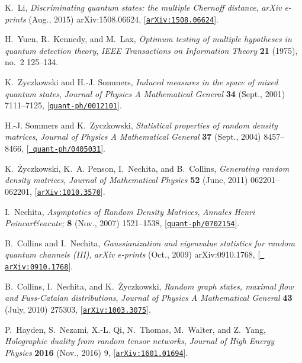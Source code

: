 \documentclass[a4paper,11pt]{article}
\begin{document}
\begin{thebibliography}{100}
K.~{Li}, {\it {Discriminating quantum states: the multiple Chernoff distance}},
   {\em arXiv e-prints} (Aug., 2015) arXiv:1508.06624,
  [\href{http://arxiv.org/abs/1508.06624}{{\tt arXiv:1508.06624}}].

H.~{Yuen}, R.~{Kennedy}, and M.~{Lax}, {\it Optimum testing of multiple
  hypotheses in quantum detection theory},  {\em IEEE Transactions on
  Information Theory} {\bf 21} (1975), no.~2 125--134.

K.~{Zyczkowski} and H.-J. {Sommers}, {\it {Induced measures in the space of
  mixed quantum states}},  {\em Journal of Physics A Mathematical General} {\bf
  34} (Sept., 2001) 7111--7125,
  [\href{http://arxiv.org/abs/quant-ph/0012101}{{\tt quant-ph/0012101}}].

H.-J. {Sommers} and K.~{Zyczkowski}, {\it {Statistical properties of random
  density matrices}},  {\em Journal of Physics A Mathematical General} {\bf 37}
  (Sept., 2004) 8457--8466, [\href{http://arxiv.org/abs/quant-ph/0405031}{{\tt
  quant-ph/0405031}}].

K.~{{\.Z}yczkowski}, K.~A. {Penson}, I.~{Nechita}, and B.~{Collins}, {\it
  {Generating random density matrices}},  {\em Journal of Mathematical Physics}
  {\bf 52} (June, 2011) 062201--062201,
  [\href{http://arxiv.org/abs/1010.3570}{{\tt arXiv:1010.3570}}].

I.~{Nechita}, {\it {Asymptotics of Random Density Matrices}},  {\em Annales
  Henri Poincar\&eacute;} {\bf 8} (Nov., 2007) 1521--1538,
  [\href{http://arxiv.org/abs/quant-ph/0702154}{{\tt quant-ph/0702154}}].

B.~{Collins} and I.~{Nechita}, {\it {Gaussianization and eigenvalue statistics
  for random quantum channels (III)}},  {\em arXiv e-prints} (Oct., 2009)
  arXiv:0910.1768, [\href{http://arxiv.org/abs/0910.1768}{{\tt
  arXiv:0910.1768}}].

B.~{Collins}, I.~{Nechita}, and K.~{{\.Z}yczkowski}, {\it {Random graph states,
  maximal flow and Fuss-Catalan distributions}},  {\em Journal of Physics A
  Mathematical General} {\bf 43} (July, 2010) 275303,
  [\href{http://arxiv.org/abs/1003.3075}{{\tt arXiv:1003.3075}}].

P.~{Hayden}, S.~{Nezami}, X.-L. {Qi}, N.~{Thomas}, M.~{Walter}, and Z.~{Yang},
  {\it {Holographic duality from random tensor networks}},  {\em Journal of
  High Energy Physics} {\bf 2016} (Nov., 2016) 9,
  [\href{http://arxiv.org/abs/1601.01694}{{\tt arXiv:1601.01694}}].


\end{thebibliography}
\end{document}
